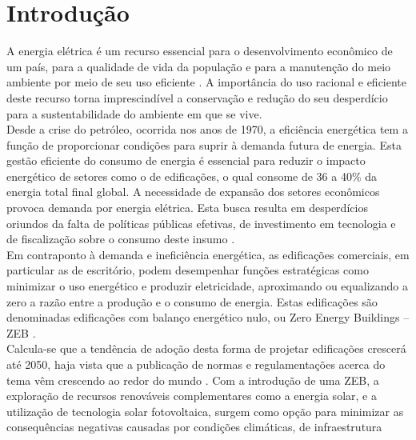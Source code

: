 \section{Introdução}
     A energia elétrica é um recurso essencial para o desenvolvimento econômico de um país, 
     para a qualidade  de  vida  da  população  e para  a  manutenção  do meio  ambiente
     por  meio  de  seu  uso eficiente \cite{Fonseca2016}. A importância do uso racional
     e eficiente deste recurso torna imprescindível a conservação e redução do seu 
     desperdício para a sustentabilidade do ambiente em que se vive.\\ Desde  a  crise  do  
     petróleo,  ocorrida nos  anos  de 1970,  a eficiência  energética tem  a  função  de 
     proporcionar  condições  para  suprir  à  demanda  futura  de  energia.  Esta  gestão  
     eficiente  do consumo  de  energia  é  essencial  para  reduzir  o  impacto  energético  
     de  setores  como  o  de edificações, o qual consome de 36 a 40\% da energia total final
     global. A necessidade de expansão dos   setores   econômicos   provoca   demanda   por
     energia   elétrica.   Esta   busca   resulta   em desperdícios oriundos da falta de 
     políticas públicas efetivas, de investimento em tecnologia e de fiscalização   sobre 
     o   consumo   deste   insumo \cite{InternationalEnergyAgency-IEA2019,InternationalEnergyAgency-IEA2019a,
     UnitedNationsEnvironmentProgramme-UNEP2019,UnitedNations2017}.\\
     Em contraponto à demanda e ineficiência energética, as edificações comerciais, em particular 
     as de  escritório,  podem  desempenhar  funções  estratégicas  como  minimizar  o  uso  
     energético  e produzir eletricidade, aproximando ou equalizando a zero a razão entre a 
     produção e o consumo de energia. Estas edificações são denominadas edificações com balanço 
     energético nulo, ou Zero Energy Buildings  –  ZEB \cite{Crawley2009,Torcellini2006,Kurnitski2011,Kurnitski2015,Torcellini2015}.\\
     Calcula-se  que  a  tendência  de  adoção  desta  forma  de  projetar edificações crescerá 
     até 2050, haja vista que a publicação de normas e regulamentações acerca do tema vêm 
     crescendo ao redor do mundo \cite{UnitedNationsEnvironmentProgramme-UNEP2019}. Com  a  introdução  de  uma  ZEB,  a  
     exploração  de  recursos  renováveis  complementares  como  a energia solar, e a utilização 
     de tecnologia solar fotovoltaica, surgem como opção para minimizar as    consequências    
     negativas    causadas    por    condições    climáticas,    de    infraestrutura    
